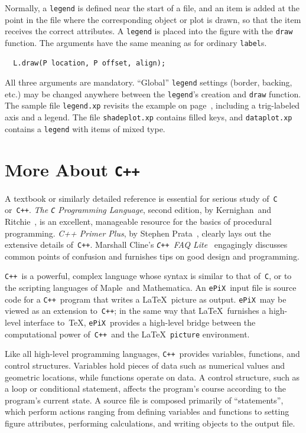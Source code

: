 \documentclass[12pt,letterpaper]{book}
\newcommand{\code}[1]{\texttt{#1}}
\newcommand{\filename}[1]{\texttt{#1}}
\newcommand{\ePiX}{\code{ePiX}}
\newcommand{\C}{\code{C}}
\newcommand{\CXX}{\code{C++}}
\newcommand{\findex}[1]{\ignorespaces}
\begin{document}
Normally, a \code{legend} is defined near the start of a file, and an
item is added at the point in the file where the corresponding object
or plot is drawn, so that the item receives the correct attributes. A
\code{legend} is placed into the figure with the \code{draw}
function. The arguments have the same meaning as for ordinary
\code{label}s.
\findex{legend.draw}
\begin{verbatim}
  L.draw(P location, P offset, align);
\end{verbatim}
All three arguments are mandatory.  ``Global'' \code{legend} settings
(border, backing, etc.) may be changed anywhere between the
\code{legend}'s creation and \code{draw} function. The sample file
\filename{legend.xp} revisits the example on
page~\pageref{taylor_poly}, including a trig-labeled axis and a
legend. The file \filename{shadeplot.xp} contains filled keys, and
\filename{dataplot.xp} contains a \code{legend} with items of mixed
type.


\section{More About \CXX}
\index{Cplusplus@\CXX|(emph}

A textbook or similarly detailed reference is essential for serious
study of~\code{C} or~\CXX. \emph{The \code{C} Programming Language},
second edition, by Kernighan~and Ritchie~\cite{KnR}, is an excellent,
manageable resource for the basics of procedural
programming. \emph{C++ Primer Plus}, by Stephen Prata~\cite{Prata},
clearly lays out the extensive details of~\CXX.  Marshall Cline's
\emph{\CXX\ FAQ Lite}~\cite{Cline} engagingly discusses common points
of confusion and furnishes tips on good design and programming.

\CXX\ is a powerful, complex language whose syntax is similar to that
of~\C, or to the scripting languages of Maple~and Mathematica. An
\ePiX\ input file is source code for a \CXX~program that writes a
\LaTeX\ picture as output.  \ePiX\ may be viewed as an extension
to~\CXX; in the same way that \LaTeX\ furnishes a high-level interface
to~\TeX, \ePiX\ provides a high-level bridge between the computational
power of~\CXX\ and the \LaTeX\ \code{picture} environment.

Like all high-level programming languages, \CXX\ provides variables,
functions, and control structures. Variables hold pieces of data such
as numerical values and geometric locations, while functions operate
on data. A control structure, such as a loop or conditional statement,
affects the program's course according to the program's current state.
A source file is composed primarily of ``statements'', which perform
actions ranging from defining variables and functions to setting
figure attributes, performing calculations, and writing objects to the
output file.
\end{document}
